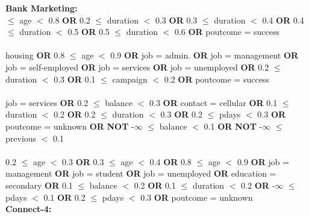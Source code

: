 \noindent \textbf{ Bank Marketing: }\\

 $\le$ age $<$ 0.8 \textbf{OR} 0.2 $\le$ duration $<$ 0.3 \textbf{OR} 0.3 $\le$ duration $<$ 0.4 \textbf{OR} 0.4 $\le$ duration $<$ 0.5 \textbf{OR} 0.5 $\le$ duration $<$ 0.6 \textbf{OR} poutcome = success \\\\housing \textbf{OR} 0.8 $\le$ age $<$ 0.9 \textbf{OR} job = admin. \textbf{OR} job = management \textbf{OR} job = self-employed \textbf{OR} job = services \textbf{OR} job = unemployed \textbf{OR} 0.2 $\le$ duration $<$ 0.3 \textbf{OR} 0.1 $\le$ campaign $<$ 0.2 \textbf{OR} poutcome = success \\\\job = services \textbf{OR} 0.2 $\le$ balance $<$ 0.3 \textbf{OR} contact = cellular \textbf{OR} 0.1 $\le$ duration $<$ 0.2 \textbf{OR} 0.2 $\le$ duration $<$ 0.3 \textbf{OR} 0.2 $\le$ pdays $<$ 0.3 \textbf{OR} poutcome = unknown \textbf{OR}  \textbf{NOT} -$\infty$ $\le$ balance $<$ 0.1 \textbf{OR}  \textbf{NOT} -$\infty$ $\le$ previous $<$ 0.1 \\\\0.2 $\le$ age $<$ 0.3 \textbf{OR} 0.3 $\le$ age $<$ 0.4 \textbf{OR} 0.8 $\le$ age $<$ 0.9 \textbf{OR} job = management \textbf{OR} job = student \textbf{OR} job = unemployed \textbf{OR} education = secondary \textbf{OR} 0.1 $\le$ balance $<$ 0.2 \textbf{OR} 0.1 $\le$ duration $<$ 0.2 \textbf{OR} -$\infty$ $\le$ pdays $<$ 0.1 \textbf{OR} 0.2 $\le$ pdays $<$ 0.3 \textbf{OR} poutcome = unknown \\

\noindent \textbf{ Connect-4: }\\


